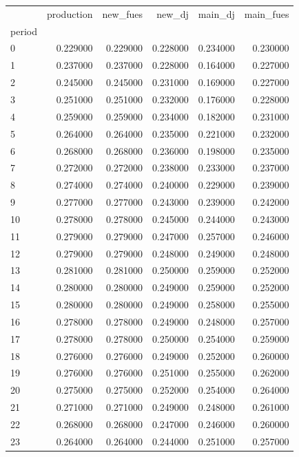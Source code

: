 \begin{tabular}{lrrrrr}
\toprule
 & production & new_fues & new_dj & main_dj & main_fues \\
period &  &  &  &  &  \\
\midrule
0 & 0.229000 & 0.229000 & 0.228000 & 0.234000 & 0.230000 \\
1 & 0.237000 & 0.237000 & 0.228000 & 0.164000 & 0.227000 \\
2 & 0.245000 & 0.245000 & 0.231000 & 0.169000 & 0.227000 \\
3 & 0.251000 & 0.251000 & 0.232000 & 0.176000 & 0.228000 \\
4 & 0.259000 & 0.259000 & 0.234000 & 0.182000 & 0.231000 \\
5 & 0.264000 & 0.264000 & 0.235000 & 0.221000 & 0.232000 \\
6 & 0.268000 & 0.268000 & 0.236000 & 0.198000 & 0.235000 \\
7 & 0.272000 & 0.272000 & 0.238000 & 0.233000 & 0.237000 \\
8 & 0.274000 & 0.274000 & 0.240000 & 0.229000 & 0.239000 \\
9 & 0.277000 & 0.277000 & 0.243000 & 0.239000 & 0.242000 \\
10 & 0.278000 & 0.278000 & 0.245000 & 0.244000 & 0.243000 \\
11 & 0.279000 & 0.279000 & 0.247000 & 0.257000 & 0.246000 \\
12 & 0.279000 & 0.279000 & 0.248000 & 0.249000 & 0.248000 \\
13 & 0.281000 & 0.281000 & 0.250000 & 0.259000 & 0.252000 \\
14 & 0.280000 & 0.280000 & 0.249000 & 0.259000 & 0.252000 \\
15 & 0.280000 & 0.280000 & 0.249000 & 0.258000 & 0.255000 \\
16 & 0.278000 & 0.278000 & 0.249000 & 0.248000 & 0.257000 \\
17 & 0.278000 & 0.278000 & 0.250000 & 0.254000 & 0.259000 \\
18 & 0.276000 & 0.276000 & 0.249000 & 0.252000 & 0.260000 \\
19 & 0.276000 & 0.276000 & 0.251000 & 0.255000 & 0.262000 \\
20 & 0.275000 & 0.275000 & 0.252000 & 0.254000 & 0.264000 \\
21 & 0.271000 & 0.271000 & 0.249000 & 0.248000 & 0.261000 \\
22 & 0.268000 & 0.268000 & 0.247000 & 0.246000 & 0.260000 \\
23 & 0.264000 & 0.264000 & 0.244000 & 0.251000 & 0.257000 \\

\end{tabular}
